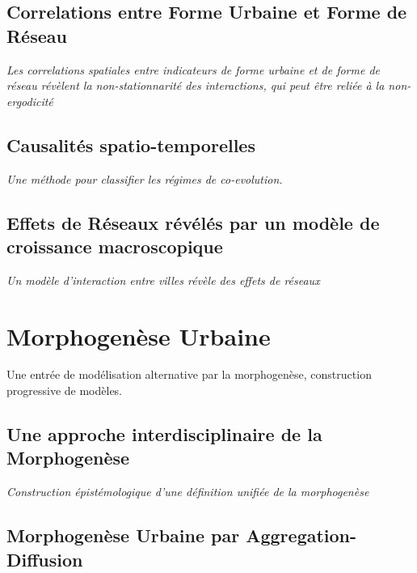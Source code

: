 \subsection{Correlations entre Forme Urbaine et Forme de Réseau}

\textit{Les correlations spatiales entre indicateurs de forme urbaine et de forme de réseau révèlent la non-stationnarité des interactions, qui peut être reliée à la non-ergodicité}


\subsection{Causalités spatio-temporelles}


\textit{Une méthode pour classifier les régimes de co-evolution.}


\subsection{Effets de Réseaux révélés par un modèle de croissance macroscopique}


\textit{Un modèle d'interaction entre villes révèle des effets de réseaux}





\section{Morphogenèse Urbaine}

{\color{blue}Une entrée de modélisation alternative par la morphogenèse, construction progressive de modèles.}

\subsection{Une approche interdisciplinaire de la Morphogenèse}

\textit{Construction épistémologique d'une définition unifiée de la morphogenèse}


\subsection{Morphogenèse Urbaine par Aggregation-Diffusion}

